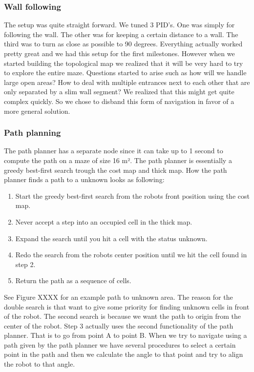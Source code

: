 \subsubsection{Wall following}
The setup was quite straight forward. We tuned 3 PID’s. One was simply for following the wall. The other was for keeping a certain distance to a wall. The third was to turn as close as possible to 90 degrees. Everything actually worked pretty great and we had this setup for the first milestones. However when we started building the topological map we realized that it will be very hard to try to explore the entire maze. Questions started to arise such as how will we handle large open areas? How to deal with multiple entrances next to each other that are only separated by a slim wall segment? We realized that this might get quite complex quickly. So we chose to disband this form of navigation in favor of a more general solution.

\subsubsection{Path planning}
The path planner has a separate node since it can take up to 1 second to compute the path on a maze of size 16 m². The path planner is essentially a greedy best-first search trough the cost map and thick map. How the path planner finds a path to a unknown looks as following:

\begin{enumerate}
\item Start the greedy best-first search from the robots front position using the cost map.
\item Never accept a step into an occupied cell in the thick map.
\item Expand the search until you hit a cell with the status unknown.
\item Redo the search from the robots center position until we hit the cell found in step 2.
\item Return the path as a sequence of cells.
\end{enumerate}

See Figure XXXX for an example path to unknown area. The reason for the double search is that want to give some priority for finding unknown cells in front of the robot. The second search is because we want the path to origin from the center of the robot. Step 3 actually uses the second functionality of the path planner. That is to go from point A to point B. When we try to navigate using a path given by the path planner we have several procedures to select a certain point in the path and then we calculate the angle to that point and try to align the robot to that angle.

